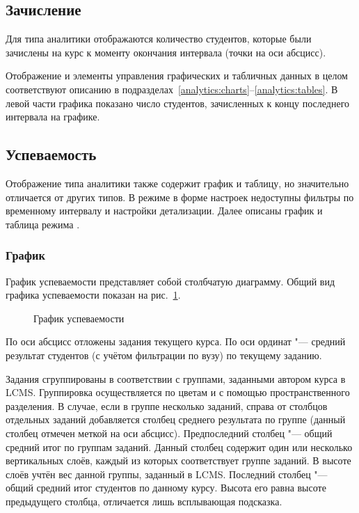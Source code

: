\subsection{Зачисление}
\label{analytics:enrollment}

Для типа аналитики  отображаются количество студентов, которые были зачислены на курс к 
моменту окончания интервала (точки на оси абсцисс).

Отображение и элементы управления графических и табличных данных в целом соответствуют описанию в 
подразделах~\ref{analytics:charts}--\ref{analytics:tables}. В левой части графика показано число
студентов, зачисленных к концу последнего интервала на графике.

\subsection{Успеваемость}
\label{analytics:progress}

Отображение типа аналитики  также содержит график и таблицу, но значительно
отличается от других типов. В режиме  в форме настроек недоступны фильтры
по временному интервалу и настройки детализации. Далее описаны график и таблица режима .

\subsubsection{График}

График успеваемости представляет собой столбчатую диаграмму. 
Общий вид графика успеваемости показан на рис.~\ref{analytics:progress:chart}.


\begin{figure}[H]
	\caption{График успеваемости}
	\label{analytics:progress:chart}
\end{figure}

По оси абсцисс отложены задания текущего курса. По оси ординат "--- средний результат студентов 
(с учётом фильтрации по вузу) по текущему заданию.

Задания сгруппированы в соответствии с группами, заданными автором курса в LCMS.
Группировка осуществляется по цветам и с помощью пространственного разделения.
В случае, если в группе несколько заданий, справа от столбцов отдельных заданий добавляется столбец 
среднего результата по группе (данный столбец отмечен меткой на оси абсцисс). Предпоследний столбец 
"--- общий средний итог по группам заданий. Данный столбец содержит один или несколько вертикальных слоёв,
каждый из которых соответствует группе заданий. В высоте слоёв учтён вес данной группы, 
заданный в LCMS. Последний столбец "--- общий средний итог студентов по данному курсу. Высота его
равна высоте предыдущего столбца, отличается лишь всплывающая подсказка.

